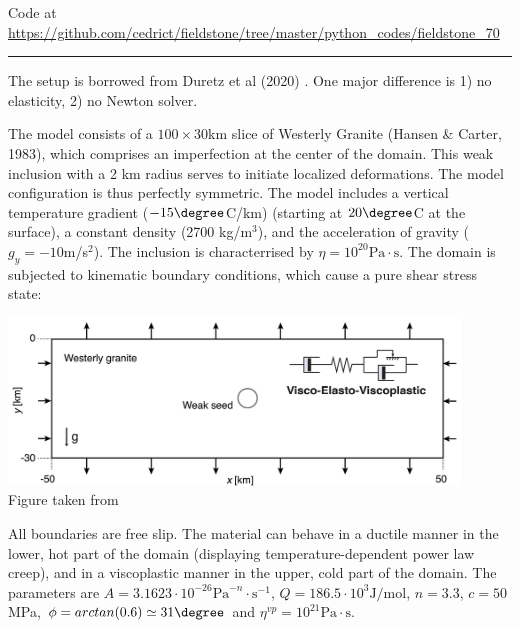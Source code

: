 

\begin{center}
Code at \url{https://github.com/cedrict/fieldstone/tree/master/python_codes/fieldstone_70}
\end{center}

\par\noindent\rule{\textwidth}{0.4pt}


The setup is borrowed from Duretz et al (2020) \cite{dudy20}. One major difference is 1) no elasticity,
2) no Newton solver.


The model consists of a $100\times 30$km slice of Westerly Granite (Hansen \& Carter, 1983), 
which comprises an imperfection at the center of the domain.
This weak inclusion with a 2 km radius serves to initiate
localized deformations. The model configuration is thus perfectly symmetric. 
The model includes a vertical temperature gradient ($-15\degree$C/km) (starting 
at $20\degree$C at the surface), 
a constant density (2700 kg/m$^3$), and the acceleration of gravity ($g_y=-10$m/s$^2$).
The inclusion is characterrised by $\eta=10^{20}\text{Pa}\cdot \text{s}$.
The domain is subjected to kinematic boundary conditions, which cause a pure shear stress
state:

\begin{center}
\includegraphics[width=12cm]{python_codes/fieldstone_70/images/fig1}\\
{\captionfont Figure taken from \cite{dudy20}}
\end{center}

All boundaries are free slip. The material can behave in a ductile manner in the lower, hot
part of the domain (displaying temperature-dependent power law creep), and in a viscoplastic 
manner in the upper, cold part of the domain. 
The parameters are 
$A=3.1623\cdot 10^{-26}\text{Pa}^{-n}\cdot\text{s}^{-1}$, $Q=186.5\cdot 10^3 \text{J/mol}$, 
$n=3.3$, $c=50$MPa, $\phi=arctan(0.6)\simeq 31\degree$ and $\eta^{vp}=10^{21}\text{Pa}\cdot\text{s}$. 


